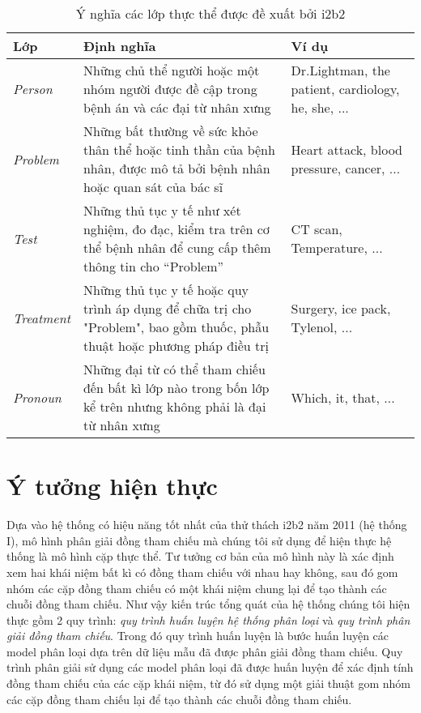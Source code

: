 \begin{table}[th]
\centering{}
\caption{Ý nghĩa các lớp thực thể được đề xuất bởi i2b2\label{tab:EntityLabels}}
\footnotesize\sffamily

\begin{tabularx}{\textwidth}{@{}lLP{\raggedright}{0.3}@{}}
\toprule
\textbf{Lớp} & \textbf{Định nghĩa} & \textbf{Ví dụ}\\
\midrule
\emph{Person} & Những chủ thể người hoặc một nhóm người được đề cập trong bệnh án và các đại từ nhân xưng & Dr.Lightman, the patient, cardiology, he, she, ...\\
\emph{Problem} & Những bất thường về sức khỏe thân thể hoặc tinh thần của bệnh nhân, được mô tả bởi bệnh nhân hoặc quan sát của bác sĩ & Heart attack, blood pressure, cancer, ...\\
\emph{Test} & Những thủ tục y tế như xét nghiệm, đo đạc, kiểm tra trên cơ thể bệnh nhân để cung cấp thêm thông tin cho “Problem” & CT scan, Temperature, ...\\
\emph{Treatment} & Những thủ tục y tế hoặc quy trình áp dụng để chữa trị cho "Problem", bao gồm thuốc, phẫu thuật hoặc phương pháp điều trị & Surgery, ice pack, Tylenol, ...\\
\emph{Pronoun} & Những đại từ có thể tham chiếu đến bất kì lớp nào trong bốn lớp kể trên nhưng không phải là đại từ nhân xưng & Which, it, that, ...\\
\bottomrule
\end{tabularx}
\end{table}

\section{Ý tưởng hiện thực} \label{ytuonghienthuc}
Dựa vào hệ thống có hiệu năng tốt nhất của thử thách i2b2 năm 2011 (hệ thống I), mô hình phân giải đồng tham chiếu mà chúng tôi sử dụng để hiện thực hệ thống là mô hình cặp thực thể. Tư tưởng cơ bản của mô hình này là xác định xem hai khái niệm bất kì có đồng tham chiếu với nhau hay không, sau đó gom nhóm các cặp đồng tham chiếu có một khái niệm chung lại để tạo thành các chuỗi đồng tham chiếu. Như vậy kiến trúc tổng quát của hệ thống chúng tôi hiện thực gồm 2 quy trình: \emph{quy trình huấn luyện hệ thống phân loại} và \emph{quy trình phân giải đồng tham chiếu}. Trong đó quy trình huấn luyện là bước huấn luyện các model phân loại dựa trên dữ liệu mẫu đã được phân giải đồng tham chiếu. Quy trình phân giải sử dụng các model phân loại đã được huấn luyện để xác định tính đồng tham chiếu của các cặp khái niệm, từ đó sử dụng một giải thuật gom nhóm các cặp đồng tham chiếu lại để tạo thành các chuỗi đồng tham chiếu.

